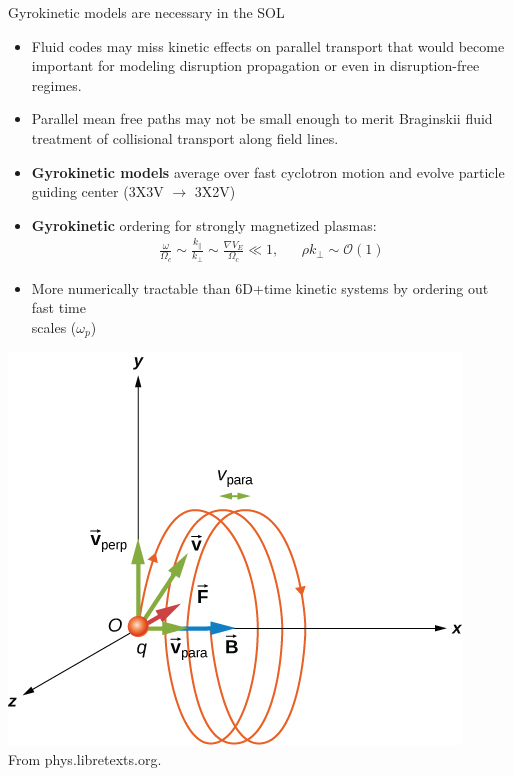 \documentclass[12pt,table]{beamer}
\begin{document}
\begin{frame}{Gyrokinetic models are necessary in the SOL}
    \begin{itemize} \footnotesize
    \item Fluid codes may miss kinetic effects on parallel transport that would become important for modeling disruption propagation or even in disruption-free regimes.
    \item Parallel mean free paths may not be small enough to merit Braginskii fluid treatment of collisional transport along field lines.
    \item \textbf{Gyrokinetic models} average over fast cyclotron motion and evolve particle guiding center (3X3V $\rightarrow$ 3X2V)
    \end{itemize}
    \vfill
    \begin{minipage}{.65\linewidth}
    \begin{itemize} \footnotesize
    \item \textbf{Gyrokinetic} ordering for strongly magnetized plasmas:
    \begin{align*}
        \frac{\omega}{\Omega_c} \sim \frac{k_\parallel}{k_\perp} \sim \frac{\nabla V_E}{\Omega_c} \ll 1, && \rho k_\perp \sim \mathcal{O}(1)
    \end{align*}
    \item More numerically tractable than 6D+time kinetic systems by ordering out fast time \\ scales ($\omega_p$)
    \end{itemize}    
    \end{minipage}%
    \begin{minipage}{.3\linewidth}
        \centering
        \includegraphics[width=1.1\linewidth]{figs/gyro-orbit.jpg} \\
        \tiny From phys.libretexts.org.
    \end{minipage}
\end{frame}
\end{document}
